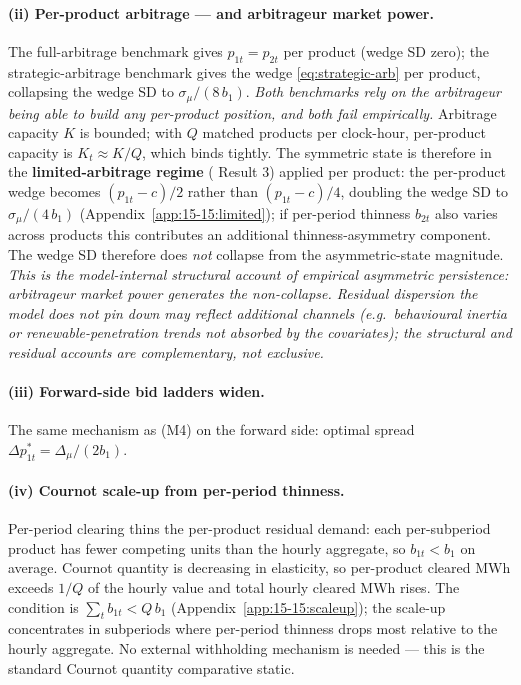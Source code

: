 \documentclass[11pt]{article}
\begin{document}
\paragraph{(ii) Per-product arbitrage --- and arbitrageur market power.} The full-arbitrage benchmark gives $p_{1t} = p_{2t}$ per product (wedge SD zero); the strategic-arbitrage benchmark gives the \citeauthor{ito_reguant_2016} wedge \eqref{eq:strategic-arb} per product, collapsing the wedge SD to $\sigma_\mu/(8\, b_1)$. \emph{Both benchmarks rely on the arbitrageur being able to build any per-product position, and both fail empirically.} Arbitrage capacity $K$ is bounded; with $Q$ matched products per clock-hour, per-product capacity is $K_t \approx K/Q$, which binds tightly. The symmetric state is therefore in the \textbf{limited-arbitrage regime} (\citeauthor{ito_reguant_2016} Result 3) applied per product: the per-product wedge becomes $(p_{1t}-c)/2$ rather than $(p_{1t}-c)/4$, doubling the wedge SD to $\sigma_\mu/(4\,b_1)$ (Appendix~\ref{app:15-15:limited}); if per-period thinness $b_{2t}$ also varies across products this contributes an additional thinness-asymmetry component. The wedge SD therefore does \emph{not} collapse from the asymmetric-state magnitude. \emph{This is the model-internal structural account of empirical asymmetric persistence: arbitrageur market power generates the non-collapse. Residual dispersion the model does not pin down may reflect additional channels (e.g.\ behavioural inertia or renewable-penetration trends not absorbed by the covariates); the structural and residual accounts are complementary, not exclusive.}

\paragraph{(iii) Forward-side bid ladders widen.} The same mechanism as (M4) on the forward side: optimal spread $\Delta p^*_{1t} = \Delta_\mu/(2 b_1)$.

\paragraph{(iv) Cournot scale-up from per-period thinness.} Per-period clearing thins the per-product residual demand: each per-subperiod product has fewer competing units than the hourly aggregate, so $b_{1t} < b_1$ on average. Cournot quantity is decreasing in elasticity, so per-product cleared MWh exceeds $1/Q$ of the hourly value and total hourly cleared MWh rises. The condition is $\sum_t b_{1t} < Q\, b_1$ (Appendix~\ref{app:15-15:scaleup}); the scale-up concentrates in subperiods where per-period thinness drops most relative to the hourly aggregate. No external withholding mechanism is needed --- this is the standard Cournot quantity comparative static.
\end{document}
